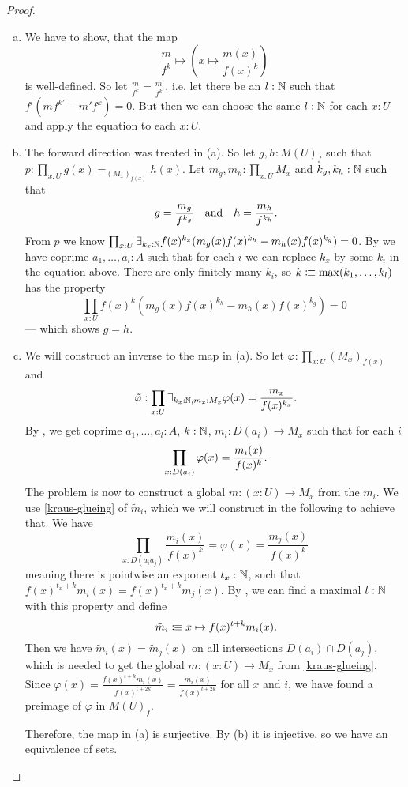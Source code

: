 \begin{proof}
  \begin{enumerate}[(a)]
  \item We have to show, that the map
    \[
      \frac{m}{f^k}\mapsto\left(x\mapsto \frac{m(x)}{f(x)^k}\right)
    \]
    is well-defined. So let $\frac{m}{f^k}=\frac{m'}{f^{k'}}$,
    i.e. let there be an $l:\mathbb{N}$ such that $f^l(mf^{k'}-m'f^k)=0$.
    But then we can choose the same $l:\mathbb{N}$ for each $x:U$
    and apply the equation to each $x:U$.
  \item The forward direction was treated in (a).
    So let $g,h:M(U)_f$ such that $p:\prod_{x:U}g(x)=_{(M_x)_{f(x)}}h(x)$.
    Let $m_g,m_h:\prod_{x:U} M_x$ and $k_g,k_h:\mathbb{N}$ such that
    \[
      g=\frac{m_g}{f^{k_g}} \quad\text{and}\quad h=\frac{m_h}{f^{k_h}}
      \rlap{.}
    \]
    From $p$ we know $\prod_{x:U}\exists_{k_x:\mathbb{N}}f(x)^{k_x}(m_g(x)f(x)^{k_h}-m_h(x)f(x)^{k_g})=0$.
    By  we have coprime $a_1,\dots,a_l:A$ such that for each $i$
    we can replace $k_x$ by some $k_i$ in the equation above.
    There are only finitely many $k_i$,
    so $k\vcentcolon\mspace{-1.2mu}\equiv \mathrm{max}(k_1, \dots, k_l)$ has the property
    \[
      \prod_{x:U}f(x)^{k}(m_g(x)f(x)^{k_h}-m_h(x)f(x)^{k_g})=0
    \]
    --- which shows $g=h$.
  \item We will construct an inverse to the map in (a).
    So let $\varphi:\prod_{x:U}(M_x)_{f(x)}$ and
    \[
      \tilde{\varphi}:
      \prod_{x:U}
      \exists_{k_x:\N,m_x:M_x}
      \varphi(x)=\frac{m_x}{f(x)^{k_x}}
      \rlap{.}
    \]
    By ,
    we get coprime $a_1,\dots,a_l:A$, $k:\mathbb{N}$, $m_i:D(a_i)\to M_x$ such that for each $i$
    \[
      \prod_{x:D(a_i)}\varphi(x)=\frac{m_i(x)}{f(x)^{k}}
      \rlap{.}
    \]
    The problem is now to construct a global $m:(x:U)\to M_x$ from the $m_i$.
    We use \cref{kraus-glueing} of $\tilde{m}_i$, which we will construct in the following to achieve that.
    We have
    \[
        \prod_{x:D(a_ia_j)}\frac{m_i(x)}{f(x)^k}=\varphi(x)=\frac{m_j(x)}{f(x)^k}
    \]
    meaning there is pointwise an exponent $t_x:\mathbb{N}$, such that $f(x)^{t_x+k}m_i(x)=f(x)^{t_x+k}m_j(x)$.
    By , we can find a maximal $t:\mathbb{N}$ with this property and define
    \[
      \tilde{m}_i\colonequiv x \mapsto f(x)^{t+k}m_i(x)
      \rlap{.}
    \]
    Then we have $\tilde{m}_i(x)=\tilde{m}_j(x)$ on all intersections $D(a_i)\cap D(a_j)$,
    which is needed to get the global $m:(x:U)\to M_x$ from \cref{kraus-glueing}.
    Since $\varphi(x)=\frac{f(x)^{t+k}m_i(x)}{f(x)^{t+2k}}=\frac{\tilde{m}_i(x)}{f(x)^{t+2k}}$ for all $x$ and $i$,
    we have found a preimage of $\varphi$ in $M(U)_f$.

    Therefore, the map in (a) is surjective.
    By (b) it is injective, so we have an equivalence of sets.
  \end{enumerate}
\end{proof}

